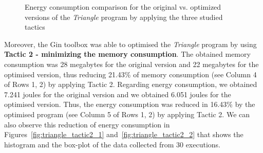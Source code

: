 \begin{figure}
{}
\caption{Energy consumption comparison for the original vs. optimized versions of the \textit{Triangle} program by applying the three studied tactics}
\label{fig:graphsTriangle}
\end{figure}

\vspace{.5em}
Moreover, the Gin toolbox was able to optimised the \textit{Triangle} program by using \textbf{Tactic 2 - minimizing the memory consumption}. The obtained memory consumption was 28 megabytes for the original version and 22 megabytes for the optimised version, thus reducing 21.43\% of memory consumption (see Column 4 of Rows 1, 2) by applying Tactic 2. 
Regarding energy consumption, we obtained 7.241 joules for the original version and we obtained 6.051 joules for the optimised version. Thus, the energy consumption was reduced in 16.43\% by the optimised program (see Column 5 of Rows 1, 2) by applying Tactic 2.
We can also observe this reduction of energy consumption in Figures~\ref{fig:triangle_tactic2_1} and~\ref{fig:triangle_tactic2_2} that shows the histogram and the box-plot of the data collected from 30 executions.

